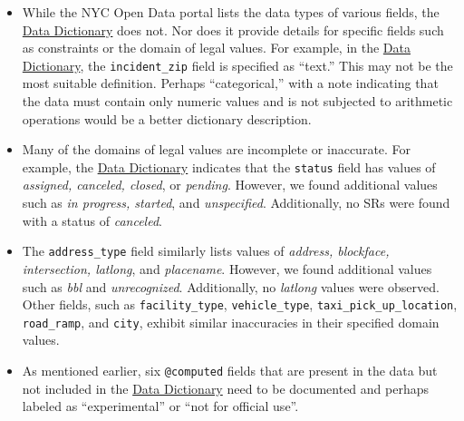 \documentclass[linenumber]{jdsart}
\begin{document}
\begin{itemize}[left=1.5em]
    \item While the NYC Open Data portal lists the data types of various 
    fields, the \href{https://data.cityofnewyork.us/api/views/erm2-nwe9/files/b372b884-f86a-453b-ba16-1fe06ce9d212?download=true&filename=311_ServiceRequest_2010-Present_DataDictionary_Updated_2023.xlsx}{Data Dictionary} does not. Nor does it provide details for specific fields such as constraints or the domain of legal 
    values. For example, in the \href{https://data.cityofnewyork.us/api/views/erm2-nwe9/files/b372b884-f86a-453b-ba16-1fe06ce9d212?download=true&filename=311_ServiceRequest_2010-Present_DataDictionary_Updated_2023.xlsx}{Data Dictionary}, the \texttt{incident\_zip} 
    field is specified as ``text.'' This may not be the most suitable 
    definition. Perhaps ``categorical,'' with a note indicating that 
    the data must contain only numeric values and is not subjected to 
    arithmetic operations would be a better dictionary description.
    
    \item Many of the domains of legal values are incomplete or 
    inaccurate. For example, the \href{https://data.cityofnewyork.us/api/views/erm2-nwe9/files/b372b884-f86a-453b-ba16-1fe06ce9d212?download=true&filename=311_ServiceRequest_2010-Present_DataDictionary_Updated_2023.xlsx}{Data Dictionary} indicates that the 
    \texttt{status} field has values of \textit{assigned, canceled, 
    closed}, or \textit{pending}. However, we found additional
    values such as \textit{in progress, started}, and \textit{unspecified}. 
    Additionally, no SRs were found with a status of \textit{canceled}. 
    
    \item The \texttt{address\_type} field similarly 
    lists values of \textit{address, blockface, intersection, latlong}, 
    and \textit{placename}. However, we found additional values such as 
    \textit{bbl} and \textit{unrecognized}. Additionally, no \textit{latlong} 
    values were observed. Other fields, such as \texttt{facility\_type}, 
    \texttt{vehicle\_type}, \texttt{taxi\_pick\_up\_location}, 
    \texttt{road\_ramp}, and \texttt{city}, exhibit similar inaccuracies 
    in their specified domain values.
    
	\item As mentioned earlier, six \texttt{@computed} fields that are
    present in the data but not included in the \href{https://data.cityofnewyork.us/api/views/erm2-nwe9/files/b372b884-f86a-453b-ba16-1fe06ce9d212?download=true&filename=311_ServiceRequest_2010-Present_DataDictionary_Updated_2023.xlsx}{Data Dictionary} need
    to be documented and perhaps labeled as ``experimental'' or
    ``not for official use''.
\end{itemize}
\end{document}
